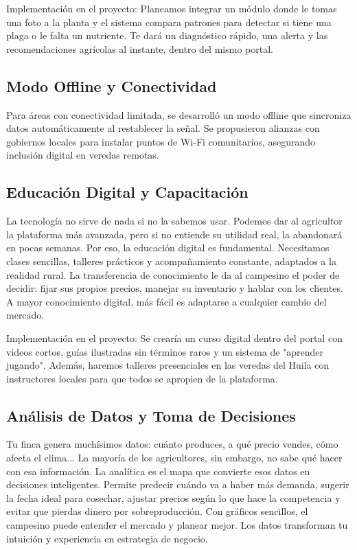 Implementación en el proyecto: Planeamos integrar un módulo donde le tomas una foto a la planta y el sistema compara patrones para detectar si tiene una plaga o le falta un nutriente. Te dará un diagnóstico rápido, una alerta y las recomendaciones agrícolas al instante, dentro del mismo portal.

\subsection{Modo Offline y Conectividad}
Para áreas con conectividad limitada, se desarrolló un modo offline que sincroniza datos automáticamente al restablecer la señal. Se propusieron alianzas con gobiernos locales para instalar puntos de Wi-Fi comunitarios, asegurando inclusión digital en veredas remotas.

\subsection{Educación Digital y Capacitación}
La tecnología no sirve de nada si no la sabemos usar. Podemos dar al agricultor la plataforma más avanzada, pero si no entiende su utilidad real, la abandonará en pocas semanas. Por eso, la educación digital es fundamental. Necesitamos clases sencillas, talleres prácticos y acompañamiento constante, adaptados a la realidad rural. La transferencia de conocimiento le da al campesino el poder de decidir: fijar sus propios precios, manejar su inventario y hablar con los clientes. A mayor conocimiento digital, más fácil es adaptarse a cualquier cambio del mercado.

Implementación en el proyecto: Se crearía un curso digital dentro del portal con videos cortos, guías ilustradas sin términos raros y un sistema de "aprender jugando". Además, haremos talleres presenciales en las veredas del Huila con instructores locales para que todos se apropien de la plataforma.

\subsection{Análisis de Datos y Toma de Decisiones}
Tu finca genera muchísimos datos: cuánto produces, a qué precio vendes, cómo afecta el clima... La mayoría de los agricultores, sin embargo, no sabe qué hacer con esa información. La analítica es el mapa que convierte esos datos en decisiones inteligentes. Permite predecir cuándo va a haber más demanda, sugerir la fecha ideal para cosechar, ajustar precios según lo que hace la competencia y evitar que pierdas dinero por sobreproducción. Con gráficos sencillos, el campesino puede entender el mercado y planear mejor. Los datos transforman tu intuición y experiencia en estrategia de negocio.

